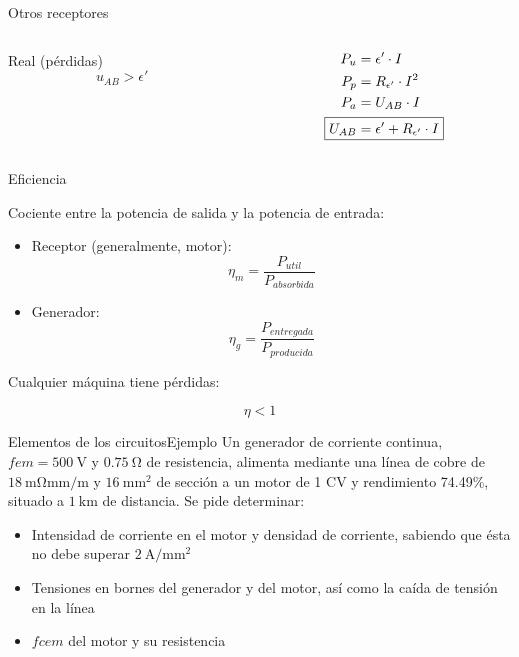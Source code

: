 \documentclass[aspectratio=169, xcolor={usenames,svgnames,dvipsnames}]{beamer}
\begin{document}
\begin{frame}{Otros receptores}
\begin{columns}
\begin{column}{0.3\columnwidth}
\begin{center}
\alert{Real} (pérdidas)
\begin{equation*}
    u_{AB}>\epsilon'
\end{equation*}
\end{center}
\end{column}
\begin{column}{0.4\columnwidth}
\begin{align*}
    P_u&=\epsilon'\cdot I\\
    P_p&=R_{\epsilon'}\cdot I^2\\
    P_a&=U_{AB}\cdot I\\
    \Aboxed{U_{AB}&=\epsilon'+R_{\epsilon'}\cdot I}
\end{align*}
\end{column}
\end{columns}
\end{frame}

\begin{frame}{Eficiencia}

Cociente entre la potencia de salida y la potencia de entrada:
\begin{itemize}
    \item Receptor (generalmente, motor):
\begin{equation*}
  \eta_m = \frac{P_{util}}{P_{absorbida}}
\end{equation*}

\item Generador:
\begin{equation*}
  \eta_g = \frac{P_{entregada}}{P_{producida}}
\end{equation*}
\end{itemize}




Cualquier máquina tiene pérdidas:

\begin{equation*}
  \boxed{\eta < 1}
\end{equation*}
\end{frame}

\begin{frame}{Elementos de los circuitos}{Ejemplo}
Un generador de corriente continua, $fem=\SI{500}{\volt}$ y $\SI{0.75}{\ohm}$ de resistencia, alimenta mediante una línea de cobre de $\SI{18}{\milli\ohm\milli\meter\per\meter}$ y $\SI{16}{\milli\meter\squared}$ de sección a un motor de 1 CV y rendimiento 74.49\%, situado a $\SI{1}{\kilo\meter}$ de distancia. Se pide determinar:
	    \begin{itemize}
	        \item Intensidad de corriente en el motor y densidad de corriente, sabiendo que ésta no debe superar $\SI{2}{\ampere/ \milli\meter\squared}$
	        \item Tensiones en bornes del generador y del motor, así como la caída de tensión en la línea
	        \item $fcem$ del motor y su resistencia
	    \end{itemize}
\end{frame}
\end{document}
